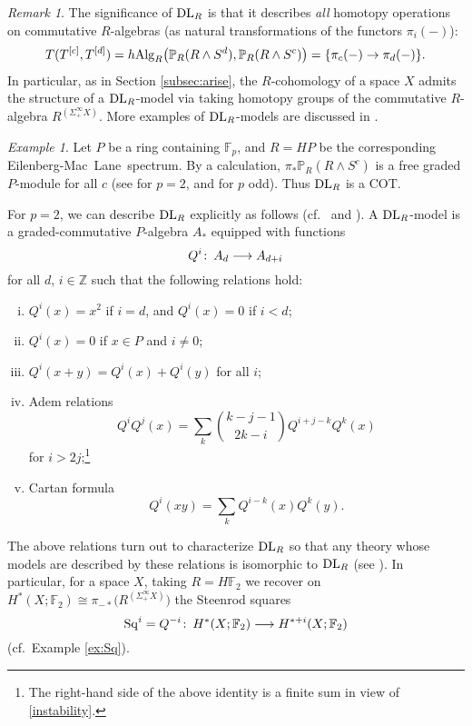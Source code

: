 \documentclass{gtpart}
\theoremstyle{definition}
\theoremstyle{remark}
\newtheorem{rmk}[thm]{Remark}
\newtheorem{ex}[thm]{Example}
\def\co{\colon\thinspace}
\newcommand{\mb}[1]{\mathbb{#1}}
\newcommand{\Alg}{{\rm Alg}}
\newcommand{\dl}{{\rm DL}}
\newcommand{\Sq}{{\rm Sq}}
\newcommand{\EM}{Eilenberg-Mac~Lane~}
\newcommand{\BF}{{\mb F}}
\newcommand{\BP}{{\mb P}}
\newcommand{\BZ}{{\mb Z}}
\numberwithin{equation}{section}
\numberwithin{thm}{section}
\begin{document}
\begin{rmk}
\label{rmk:DL}
 The significance of $\dl_R$ is that it describes {\em all} homotopy 
 operations on commutative $R$-algebras (as natural transformations of 
 the functors $\pi_i(-)$): 
 \[
  T(T^{[c]},T^{[d]}) = h\Alg_R \big( \BP_R(R \wedge S^d), 
  \BP_R(R \wedge S^c) \big) = \{\pi_c(-) \to \pi_d(-)\}.  
 \]
 In particular, as in Section \ref{subsec:arise}, the $R$-cohomology of 
 a space $X$ admits the structure of a $\dl_R$-model via taking homotopy 
 groups of the commutative $R$-algebra $R^{(\Sigma_+^\infty X)}$.  More 
 examples of $\dl_R$-models are discussed in \cite[Section 9.1]{lpo}.  
\end{rmk}

\begin{ex}
\label{ex:HR}
 Let $P$ be a ring containing $\BF_p$, and $R = HP$ be the corresponding 
 \EM spectrum.  By a calculation, $\pi_* \BP_R (R \wedge S^c)$ is a free 
 graded $P$-module for all $c$ (see \cite[pp 33-34]{lpo} for $p=2$, and 
 \cite[Section 12]{lpo} for $p$ odd).  Thus $\dl_R$ is a COT.  

 For $p=2$, we can describe $\dl_R$ explicitly as follows 
 (cf.~\cite[VIII.3.3 and IX.2.1]{H_infty} and \cite[Section 10]{lpo}).  
 A $\dl_R$-model is a graded-commutative $P$-algebra $A_*$ equipped with 
 functions 
 \[
  Q^i \co A_d \longrightarrow A_{d+i} 
 \]
 for all $d$, $i \in \BZ$ such that the following relations hold: 
 \begin{enumerate}[(i)]
  \item \label{instability} $Q^i(x) = x^2$ if $i = d$, and $Q^i(x) = 0$ 
  if $i<d$; 

  \item $Q^i(x) = 0$ if $x \in P$ and $i \neq 0$; 

  \item $Q^i(x+y) = Q^i(x) + Q^i(y)$ for all $i$; 

  \item Adem relations 
  \[
   Q^iQ^j(x) = \sum_k {k - j - 1 \choose 2k - i} Q^{i+j-k}Q^k (x) 
  \]
  for $i>2j$;\footnote{The right-hand side of the above identity is a 
  finite sum in view of \eqref{instability}.  } 

  \item Cartan formula 
  \[
   Q^i(xy) = \sum_k Q^{i-k}(x) Q^k(y).  
  \]
 \end{enumerate}

 The above relations turn out to characterize $\dl_R$ so that any theory 
 whose models are described by these relations is isomorphic to $\dl_R$ 
 (see \cite[Sections 10 and 11]{lpo}).  In particular, for a space $X$, 
 taking $R = H\BF_2$ we recover on 
 $H^*(X;\BF_2) \cong \pi_{-*} \big( R^{(\Sigma_+^\infty X)} \big)$ the 
 Steenrod squares 
 \[
  \Sq^i = Q^{-i} \co H^*(X;\BF_2) \longrightarrow H^{*+i}(X;\BF_2) 
 \]
 (cf.~Example \ref{ex:Sq}).  
\end{ex}
\end{document}
